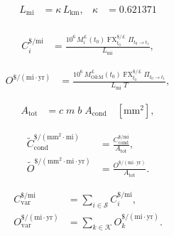 \begin{align}
    L_{\mathrm{mi}} &= \kappa \, L_{\mathrm{km}},           & \kappa &= 0.621371 \\
    \end{align}
    
    \begin{align}
    C_{i}^{\$/\mathrm{mi}}
      &= \frac{10^{6}\, M_{i}^{\pounds}(t_0)\; \mathrm{FX}_{t_0}^{\$/\pounds}\; \Pi_{t_0\rightarrow t_1}}
              {L_{\mathrm{mi}}} ,
    \end{align}
    
    
    \begin{align}
    O^{\$/(\mathrm{mi}\! \cdot\! \mathrm{yr})}
      &= \frac{10^{6}\, M_{\mathrm{O\&M}}^{\pounds}(t_0)\; \mathrm{FX}_{t_0}^{\$/\pounds}\; \Pi_{t_0\rightarrow t_1}}
              {L_{\mathrm{mi}} \; T} ,
    \end{align}
    
    \begin{align}
    A_{\mathrm{tot}} &= c \; m \; b \; A_{\mathrm{cond}} \quad [\mathrm{mm}^{2}],
    \end{align}
    
    \begin{align}
    \tilde{C}_{\mathrm{cond}}^{\$/(\mathrm{mm}^{2}\!\cdot\!\mathrm{mi})}
      &= \frac{C_{\mathrm{cond}}^{\$/\mathrm{mi}}}{A_{\mathrm{tot}}},\\[4pt]
    \tilde{O}^{\$/(\mathrm{mm}^{2}\!\cdot\!\mathrm{mi}\!\cdot\!\mathrm{yr})}
      &= \frac{O^{\$/(\mathrm{mi}\!\cdot\!\mathrm{yr})}}{A_{\mathrm{tot}}}.
    \end{align}
    
    \begin{align}
    C_{\mathrm{var}}^{\$/\mathrm{mi}} &= \sum_{i \in \mathcal{S}} C_{i}^{\$/\mathrm{mi}},\\
    O_{\mathrm{var}}^{\$/(\mathrm{mi}\!\cdot\!\mathrm{yr})} &= \sum_{k \in \mathcal{K}} O_{k}^{\$/(\mathrm{mi}\!\cdot\!\mathrm{yr})}.
    \end{align}
    
    